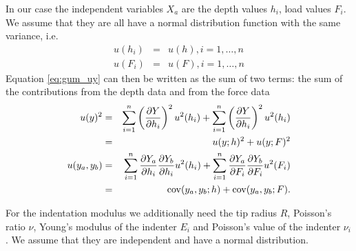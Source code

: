 In our case the independent variables $X_a$ are the depth values $h_i$, load values $F_i$. We assume that they are all have a normal distribution function with the same variance, i.e. 
\begin{eqnarray*}
u(h_i) &= &u(h), i = 1, \dots, n \\
u(F_i) &= &u(F), i = 1, \dots, n
\end{eqnarray*}
Equation \eqref{eq:gum_uy} can then be written as the sum of two terms: the sum of the contributions from the depth data and from the force data
\begin{eqnarray*}
 u(y)^2 &=& \sum_{i=1}^n \left( \frac{\partial  Y}{\partial  h_i}\right)^2 u^2(h_i) + \sum_{i=1}^n \left( \frac{\partial  Y}{\partial  h_i}\right)^2 u^2(h_i)\\
 &=& u(y;h)^2 + u(y;F)^2 \\
 u(y_a, y_b) &=& \sum_{i=1}^n \frac{\partial  Y_a}{\partial  h_i} \frac{\partial  Y_b}{\partial  h_i} u^2(h_i)+ \sum_{i=1}^n \frac{\partial  Y_a}{\partial  F_i} \frac{\partial  Y_b}{\partial  F_i} u^2(F_i) \\
 &=& \mathrm{cov}(y_a, y_b; h) + \mathrm{cov}(y_a, y_b;F).
\end{eqnarray*}


For the indentation modulus we additionally need the tip radius $R$, Poisson's ratio $\nu$, Young's modulus of the indenter $E_i$ and Poisson's value of the indenter $\nu_i$. We assume that they are independent and have a normal distribution.



 
 
 
 
 
